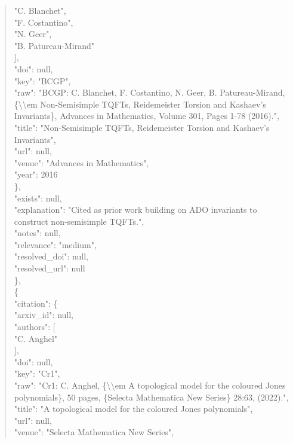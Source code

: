 \documentclass[11pt]{article}
\begin{document}
\begin{quote}
          "C. Blanchet",\\
          "F. Costantino",\\
          "N. Geer",\\
          "B. Patureau-Mirand"\\
        ],\\
        "doi": null,\\
        "key": "BCGP",\\
        "raw": "BCGP: C. Blanchet, F. Costantino, N. Geer, B. Patureau-Mirand, \{\textbackslash{}\textbackslash{}em Non-Semisimple TQFTs, Reidemeister Torsion and Kashaev's Invariants\}, Advances in Mathematics, Volume 301, Pages 1-78 (2016).",\\
        "title": "Non-Semisimple TQFTs, Reidemeister Torsion and Kashaev's Invariants",\\
        "url": null,\\
        "venue": "Advances in Mathematics",\\
        "year": 2016\\
      \},\\
      "exists": null,\\
      "explanation": "Cited as prior work building on ADO invariants to construct non-semisimple TQFTs.",\\
      "notes": null,\\
      "relevance": "medium",\\
      "resolved\_doi": null,\\
      "resolved\_url": null\\
    \},\\
    \{\\
      "citation": \{\\
        "arxiv\_id": null,\\
        "authors": [\\
          "C. Anghel"\\
        ],\\
        "doi": null,\\
        "key": "Cr1",\\
        "raw": "Cr1: C. Anghel, \{\textbackslash{}\textbackslash{}em A topological model for the coloured Jones polynomials\}, 50 pages, \{Selecta Mathematica New Series\} 28:63, (2022).",\\
        "title": "A topological model for the coloured Jones polynomials",\\
        "url": null,\\
        "venue": "Selecta Mathematica New Series",\\

\end{quote}
\end{document}
